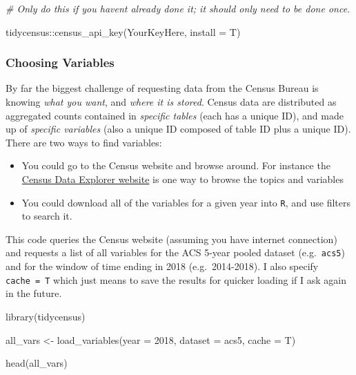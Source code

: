 \documentclass[
]{book}
\newenvironment{Shaded}{\begin{snugshade}}{\end{snugshade}}
\newcommand{\AttributeTok}[1]{\textcolor[rgb]{0.77,0.63,0.00}{#1}}
\newcommand{\CommentTok}[1]{\textcolor[rgb]{0.56,0.35,0.01}{\textit{#1}}}
\newcommand{\DecValTok}[1]{\textcolor[rgb]{0.00,0.00,0.81}{#1}}
\newcommand{\FunctionTok}[1]{\textcolor[rgb]{0.00,0.00,0.00}{#1}}
\newcommand{\NormalTok}[1]{#1}
\newcommand{\OtherTok}[1]{\textcolor[rgb]{0.56,0.35,0.01}{#1}}
\newcommand{\SpecialCharTok}[1]{\textcolor[rgb]{0.00,0.00,0.00}{#1}}
\newcommand{\StringTok}[1]{\textcolor[rgb]{0.31,0.60,0.02}{#1}}
\providecommand{\tightlist}{%
  \setlength{\itemsep}{0pt}\setlength{\parskip}{0pt}}
\begin{document}
\begin{Shaded}
\begin{Highlighting}[]
\CommentTok{\# Only do this if you haven\textquotesingle{}t already done it; it should only need to be done once.}

\NormalTok{tidycensus}\SpecialCharTok{::}\FunctionTok{census\_api\_key}\NormalTok{(}\StringTok{\textquotesingle{}YourKeyHere\textquotesingle{}}\NormalTok{, }\AttributeTok{install =}\NormalTok{ T) }
\end{Highlighting}
\end{Shaded}

\hypertarget{choosing-variables}{%
\subsubsection{Choosing Variables}\label{choosing-variables}}

By far the biggest challenge of requesting data from the Census Bureau is knowing \emph{what you want}, and \emph{where it is stored}. Census data are distributed as aggregated counts contained in \emph{specific tables} (each has a unique ID), and made up of \emph{specific variables} (also a unique ID composed of table ID plus a unique ID). There are two ways to find variables:

\begin{itemize}
\tightlist
\item
  You could go to the Census website and browse around. For instance the \href{https://data.census.gov/cedsci/}{Census Data Explorer website} is one way to browse the topics and variables
\item
  You could download all of the variables for a given year into \texttt{R}, and use filters to search it.
\end{itemize}

This code queries the Census website (assuming you have internet connection) and requests a list of all variables for the ACS 5-year pooled dataset (e.g.~\texttt{acs5}) and for the window of time ending in 2018 (e.g.~2014-2018). I also specify \texttt{cache\ =\ T} which just means to save the results for quicker loading if I ask again in the future.

\begin{Shaded}
\begin{Highlighting}[]
\FunctionTok{library}\NormalTok{(tidycensus)}

\NormalTok{all\_vars }\OtherTok{\textless{}{-}} \FunctionTok{load\_variables}\NormalTok{(}\AttributeTok{year =} \DecValTok{2018}\NormalTok{, }\AttributeTok{dataset =} \StringTok{\textquotesingle{}acs5\textquotesingle{}}\NormalTok{, }\AttributeTok{cache =}\NormalTok{ T)}

\FunctionTok{head}\NormalTok{(all\_vars)}
\end{Highlighting}
\end{Shaded}
\end{document}
